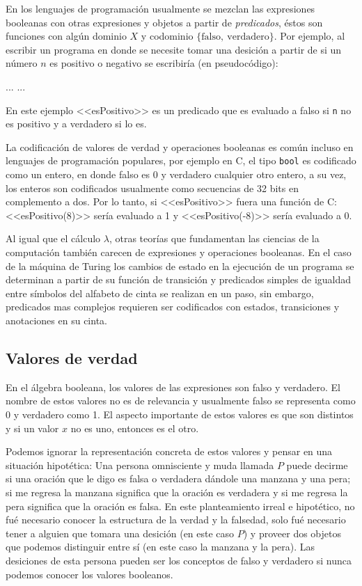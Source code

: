 En los lenguajes de programación usualmente se mezclan las expresiones booleanas con otras expresiones y objetos a partir de \emph{predicados}, éstos son funciones con algún dominio \( X \) y codominio \( \{ \mathrm{falso},\ \mathrm{verdadero} \} \). Por ejemplo, al escribir un programa en donde se necesite tomar una desición a partir de si un número \( n \) es positivo o negativo se escribiría (en pseudocódigo):

\begin{algorithmic}
  \STATE \( ... \)
  \ELSE
  \STATE \( ... \)
  \ENDIF
\end{algorithmic}

En este ejemplo <<esPositivo>> es un predicado que es evaluado a falso si \verb!n! no es positivo y a verdadero si lo es.

La codificación de valores de verdad y operaciones booleanas es común incluso en lenguajes de programación populares, por ejemplo en C, el tipo \texttt{bool} es codificado como un entero, en donde falso es 0 y verdadero cualquier otro entero, a su vez, los enteros son codificados usualmente como secuencias de 32 bits en complemento a dos. Por lo tanto, si <<esPositivo>> fuera una función de C: <<esPositivo(8)>> sería evaluado a 1 y <<esPositivo(-8)>> sería evaluado a 0.

Al igual que el cálculo \( λ \), otras teorías que fundamentan las ciencias de la computación también carecen de expresiones y operaciones booleanas. En el caso de la máquina de Turing los cambios de estado en la ejecución de un programa se determinan a partir de su función de transición y predicados simples de igualdad entre símbolos del alfabeto de cinta se realizan en un paso, sin embargo, predicados mas complejos requieren ser codificados con estados, transiciones y anotaciones en su cinta.

\subsection{Valores de verdad}
\label{sec:valores-de-verdad}

En el álgebra booleana, los valores de las expresiones son falso y verdadero. El nombre de estos valores no es de relevancia y usualmente falso se representa como 0 y verdadero como 1. El aspecto importante de estos valores es que son distintos y si un valor \( x \) no es uno, entonces es el otro.

Podemos ignorar la representación concreta de estos valores y pensar en una situación hipotética: Una persona omnisciente y muda llamada \( P \) puede decirme si una oración que le digo es falsa o verdadera dándole una manzana y una pera; si me regresa la manzana significa que la oración es verdadera y si me regresa la pera significa que la oración es falsa. En este planteamiento irreal e hipotético, no fué necesario conocer la estructura de la verdad y la falsedad, solo fué necesario tener a alguien que tomara una desición (en este caso \( P \)) y proveer dos objetos que podemos distinguir entre sí (en este caso la manzana y la pera). Las desiciones de esta persona pueden ser los conceptos de falso y verdadero si nunca podemos conocer los valores booleanos.

